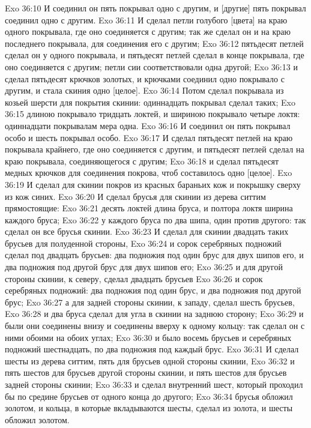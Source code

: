 Exo 36:10  И соединил он пять покрывал одно с другим, и [другие] пять покрывал соединил одно с другим.
Exo 36:11  И сделал петли голубого [цвета] на краю одного покрывала, где оно соединяется с другим; так же сделал он и на краю последнего покрывала, для соединения его с другим;
Exo 36:12  пятьдесят петлей сделал он у одного покрывала, и пятьдесят петлей сделал в конце покрывала, где оно соединяется с другим; петли сии соответствовали одна другой;
Exo 36:13  и сделал пятьдесят крючков золотых, и крючками соединил одно покрывало с другим, и стала скиния одно [целое].
Exo 36:14  Потом сделал покрывала из козьей шерсти для покрытия скинии: одиннадцать покрывал сделал таких;
Exo 36:15  длиною покрывало тридцать локтей, и шириною покрывало четыре локтя: одиннадцати покрывалам мера одна.
Exo 36:16  И соединил он пять покрывал особо и шесть покрывал особо.
Exo 36:17  И сделал пятьдесят петлей на краю покрывала крайнего, где оно соединяется с другим, и пятьдесят петлей сделал на краю покрывала, соединяющегося с другим;
Exo 36:18  и сделал пятьдесят медных крючков для соединения покрова, чтоб составилось одно [целое].
Exo 36:19  И сделал для скинии покров из красных бараньих кож и покрышку сверху из кож синих.
Exo 36:20  И сделал брусья для скинии из дерева ситтим прямостоящие:
Exo 36:21  десять локтей длина бруса, и полтора локтя ширина каждого бруса;
Exo 36:22  у каждого бруса по два шипа, один против другого: так сделал он все брусья скинии.
Exo 36:23  И сделал для скинии двадцать таких брусьев для полуденной стороны,
Exo 36:24  и сорок серебряных подножий сделал под двадцать брусьев: два подножия под один брус для двух шипов его, и два подножия под другой брус для двух шипов его;
Exo 36:25  и для другой стороны скинии, к северу, сделал двадцать брусьев
Exo 36:26  и сорок серебряных подножий: два подножия под один брус, и два подножия под другой брус;
Exo 36:27  а для задней стороны скинии, к западу, сделал шесть брусьев,
Exo 36:28  и два бруса сделал для угла в скинии на заднюю сторону;
Exo 36:29  и были они соединены внизу и соединены вверху к одному кольцу: так сделал он с ними обоими на обоих углах;
Exo 36:30  и было восемь брусьев и серебряных подножий шестнадцать, по два подножия под каждый брус.
Exo 36:31  И сделал шесты из дерева ситтим, пять для брусьев одной стороны скинии,
Exo 36:32  и пять шестов для брусьев другой стороны скинии, и пять шестов для брусьев задней стороны скинии;
Exo 36:33  и сделал внутренний шест, который проходил бы по средине брусьев от одного конца до другого;
Exo 36:34  брусья обложил золотом, и кольца, в которые вкладываются шесты, сделал из золота, и шесты обложил золотом.
